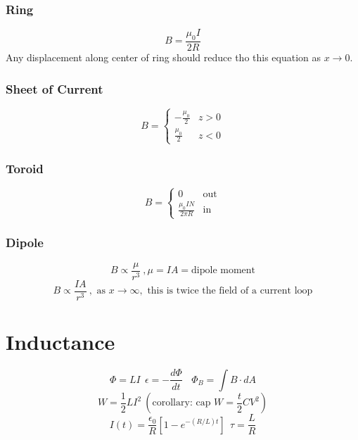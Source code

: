 \documentclass[10pt,letter]{article}
\begin{document}
\subsubsection{Ring} %
\label{ssub:ring}
\begin{equation}
    B = \frac{\mu_0I}{2R}
\end{equation}
Any displacement along center of ring should reduce tho this equation as $x \rightarrow 0$.
\subsubsection{Sheet of Current} %
\label{ssub:sheet_of_current}
\[
 B =
  \begin{cases}
   - \frac{\mu_0}{2}& z > 0\\
   \frac{\mu_0}{2} & z < 0
  \end{cases}
\]
\subsubsection{Toroid} %
\label{ssub:toroid}
\[
 B =
  \begin{cases}
   0 & \textrm{out}\\
   \frac{\mu_0IN}{2\pi R}& \textrm{in}
  \end{cases}
\]

\subsubsection{Dipole} %
\label{ssub:dipole}
\begin{equation}
    B \propto \frac{\mu}{r^3}~,\mu = IA = \textrm{dipole moment}
\end{equation}
\begin{equation}
    B \propto \frac{IA}{r^3}~, \textrm{ as } x \rightarrow \infty, \textrm{ this is twice the field of a current loop}
\end{equation}

\section{Inductance} %
\label{sec:inductance}
\begin{equation}
    \Phi = LI~~ \epsilon = - \frac{d \Phi}{dt}~~~~ \Phi_B = \int B \cdot dA
\end{equation}
\begin{equation}
    W = \frac{1}{2}LI^2~\left(\textrm{corollary: cap $W = \frac{t}{2}CV^2$} \right)
\end{equation}
\begin{equation}
    I(t) = \frac{\epsilon_0}{R} \left[ 1 - e^{-(R/L)t} \right]~~\tau = \frac{L}{R}
\end{equation}
\end{document}
